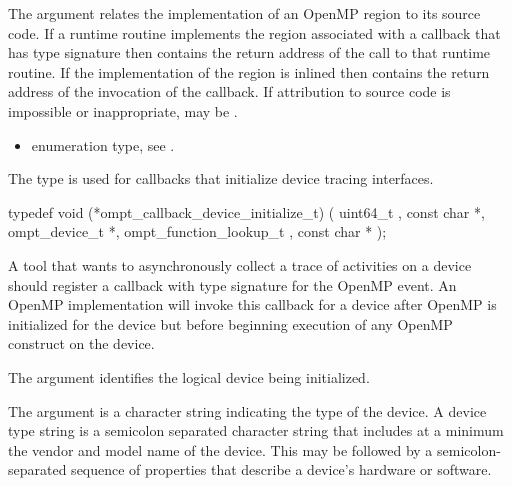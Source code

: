 The  argument relates the implementation of an OpenMP region
to its source code. If a runtime routine implements the region associated with
a callback that has type signature  then
 contains the return address of the call to that runtime routine.
If the implementation of the region is inlined then  contains the
return address of the invocation of the callback. If attribution to source code
is impossible or inappropriate, may be .

\crossreferences
\begin{itemize}
\item {} enumeration type, see .
\end{itemize}



\label{sec:ompt_callback_device_initialize_t}

\summary 
The  type is used for callbacks that 
initialize device tracing interfaces.

\format
\begin{ccppspecific}
\begin{omptCallback}
typedef void (*ompt_callback_device_initialize_t) (
  uint64_t ,
  const char *,
  ompt_device_t *,
  ompt_function_lookup_t ,
  const char *
);
\end{omptCallback}
\end{ccppspecific}

\descr
A tool that wants to asynchronously collect a trace of
activities on a device should register a callback with type signature
 for the
 OpenMP event. An OpenMP
implementation will invoke this callback for a device after OpenMP is
initialized for the device but before beginning execution of any
OpenMP construct on the device.

\argdesc
The argument  identifies the logical device
being initialized.

The argument  is a character string indicating the
type of the device. A device type string is a semicolon separated
character string that includes at a minimum the vendor and model name
of the device. This may be followed by a semicolon-separated sequence
of properties that describe a device's hardware or software.


